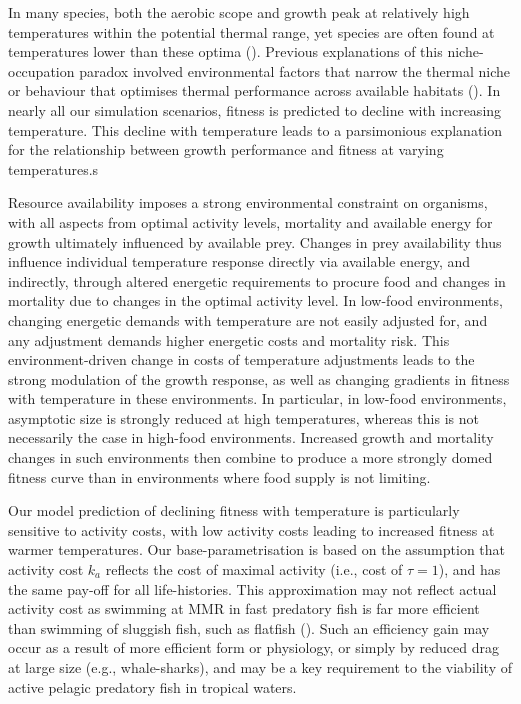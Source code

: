 \documentclass[11pt]{article}\usepackage[]{graphicx}\usepackage[]{color}
\begin{document}
In many species, both the aerobic scope and growth peak at relatively high temperatures within the potential thermal range, yet species are often found at temperatures lower than these optima (\cite{magnuson_thermal_1997, claireaux_influence_2000}). Previous explanations of this niche-occupation paradox involved environmental factors that narrow the thermal niche or behaviour that optimises thermal performance across available habitats (\cite{claireaux_influence_2000, magnuson_thermal_1997}). In nearly all our simulation scenarios, fitness is predicted to decline with increasing temperature. This decline with temperature leads to a parsimonious explanation for the relationship between growth performance and fitness at varying temperatures.s

Resource availability imposes a strong environmental constraint on organisms, with all aspects from optimal activity levels, mortality and available energy for growth ultimately influenced by available prey. Changes in prey availability thus influence individual temperature response directly via available energy, and indirectly, through altered energetic requirements to procure food and changes in mortality due to changes in the optimal activity level. In low-food environments, changing energetic demands with temperature are not easily adjusted for, and any adjustment demands higher energetic costs and mortality risk. This environment-driven change in costs of temperature adjustments leads to the strong modulation of the growth response, as well as changing gradients in fitness with temperature in these environments. In particular, in low-food environments, asymptotic size is strongly reduced at high temperatures, whereas this is not necessarily the case in high-food environments. Increased growth and mortality changes in such environments then combine to produce a more strongly domed fitness curve than in environments where food supply is not limiting.

Our model prediction of declining fitness with temperature is
particularly sensitive to activity costs, with low activity costs
leading to increased fitness at warmer temperatures. Our
base-parametrisation is based on the assumption that activity cost $k_a$ reflects the cost of maximal activity (i.e., cost of
$\tau=1$), and has the same pay-off for all life-histories. This approximation may not
reflect actual activity cost as swimming at MMR in fast predatory fish
is far more efficient than swimming of sluggish fish, such as flatfish
(\cite{priede_metabolic_1985}). Such an efficiency gain may occur as a result of more efficient form or physiology, or simply by reduced drag at large size (e.g., whale-sharks), and may be a key requirement to the viability of active pelagic predatory fish in tropical waters.
\end{document}
